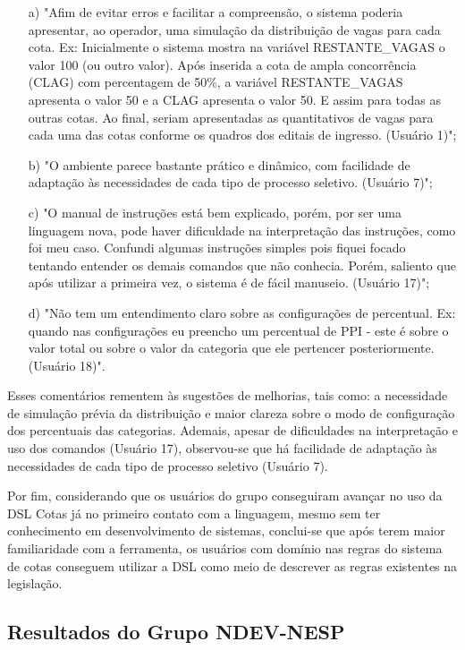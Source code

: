 \begin{enumerate}
    \item [a)] "Afim de evitar erros e facilitar a compreensão, o sistema poderia apresentar, ao operador, uma simulação da distribuição de vagas para cada cota. Ex: Inicialmente o sistema mostra na variável RESTANTE\_VAGAS o valor 100 (ou outro valor). Após inserida a cota de ampla concorrência (CLAG) com percentagem de 50\%, a variável RESTANTE\_VAGAS apresenta o valor 50 e a CLAG apresenta o valor 50. E assim para todas as outras cotas. Ao final, seriam apresentadas as quantitativos de vagas para cada uma das cotas conforme os quadros dos editais de ingresso. (Usuário 1)";
    \item [b)] "O ambiente parece bastante prático e dinâmico, com facilidade de adaptação às necessidades de cada tipo de processo seletivo. (Usuário 7)";    
    \item [c)] "O manual de instruções está bem explicado, porém, por ser uma linguagem nova, pode haver dificuldade na interpretação das instruções, como foi meu caso. Confundi algumas instruções simples pois fiquei focado tentando entender os demais comandos que não conhecia. Porém, saliento que após utilizar a primeira vez, o sistema é de fácil manuseio. (Usuário 17)";   
    \item [d)] "Não tem um entendimento claro sobre as configurações de percentual. Ex: quando nas configurações eu preencho um percentual de PPI -  este é sobre o valor total ou sobre o valor da categoria que ele pertencer posteriormente. (Usuário 18)".
\end{enumerate}

Esses comentários rementem às sugestões de melhorias, tais como: a necessidade de simulação prévia da distribuição e maior clareza sobre o modo de configuração dos percentuais das categorias. Ademais, apesar de dificuldades na interpretação e uso dos comandos (Usuário 17), observou-se que há facilidade de adaptação às necessidades de cada tipo de processo seletivo (Usuário 7).

Por fim, considerando que os usuários do grupo conseguiram avançar no uso da DSL Cotas já no primeiro contato com a linguagem, mesmo sem ter conhecimento em desenvolvimento de sistemas, conclui-se que após terem maior familiaridade com a ferramenta, os usuários com domínio nas regras do sistema de cotas conseguem utilizar a DSL como meio de descrever as regras existentes na legislação.

\newpage
\subsection{Resultados do Grupo NDEV-NESP}
\label{subsec:ndevnesp}

